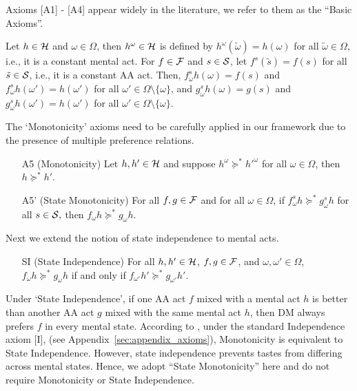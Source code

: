 \documentclass[11pt,oneside]{article}
\theoremstyle{plain}
\theoremstyle{plain}
\theoremstyle{plain}
\theoremstyle{plain}
\theoremstyle{plain}
\theoremstyle{definition}
\theoremstyle{definition}
\theoremstyle{remark}
\theoremstyle{plain}
\newcommand{\F}{{\cal F}}
\newcommand{\mcs}{{\cal S}}
\newcommand{\pfs}{\succeq^*}
\begin{document}
Axioms [A1] - [A4] appear widely in the literature, we refer to them as the ``Basic Axioms''.

Let $h \in {\cal H}$ and $\omega \in \Omega$, then $h^{\omega} \in {\cal H}$ is defined by $h^{\omega}(\tilde{\omega}) = h(\omega)$ for all $\tilde{\omega} \in \Omega$, i.e., it is a constant mental act. For $f \in \F$ and $s \in \mcs$, let $f^s(\tilde{s}) = f(s)$ for all $\tilde{s} \in \mcs$, i.e., it is a constant AA act.
Then, $f_\omega^s h (\omega)= f(s)$ and $f_\omega^s h(\omega') = h(\omega')$ for all $\omega' \in \Omega\setminus\{\omega\}$, and $g_\omega^s h(\omega) = g(s)$ and $g_\omega^s h(\omega') = h(\omega')$ for all $\omega' \in \Omega\setminus \{\omega\}$.

The `Monotonicity' axioms need to be carefully applied in our framework due to the presence of multiple preference relations.

\begin{itemize}
    \item[A5] (Monotonicity) Let $h, h' \in {\cal H}$ and suppose $h^\omega \pfs {h'}^\omega$ for all $\omega \in \Omega$, then $h \pfs h'$.
    \item[A5'] (State Monotonicity) For all $f,g \in \F$ and for all $\omega \in \Omega$, if $f_\omega^s h \pfs g_\omega^s h$ for all $s \in \mcs,$ then $f_\omega h \pfs g_\omega h$.
\end{itemize}

Next we extend the notion of state independence to mental acts.

\begin{itemize}
    \item[SI] (State Independence) For all $h,h' \in {\cal H}$, $f,g \in \F$, and $\omega, \omega' \in \Omega$, $f_\omega h \pfs g_\omega h$ if and only if $f_{\omega'} h' \pfs g_{\omega'} h'$.
\end{itemize}
Under `State Independence', if one AA act $f$ mixed with a mental act $h$ is better than another AA act $g$ mixed with the same mental act $h$, then DM  always prefers $f$ in every mental state.  
According to \cite{hill2019non}, under the standard Independence axiom [I], (see Appendix~\ref{sec:appendix_axioms}), Monotonicity is equivalent to State Independence.
However, state independence prevents tastes from differing across mental states.
Hence, we adopt ``State Monotonicity'' here and do not require Monotonicity or State Independence. 
\end{document}

